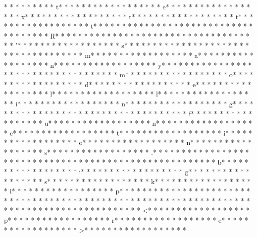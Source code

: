 *  * * *  *  * * *  * t* * *  * * *  * * *  *  * * *  *  * * *  * e* * *  * * *  * * *  *  * * *  *  * * *  * x* * *  * * *  * * *  *  * * *  *  * * *  * t* * *  * * *  * * *  *  * * *  *  * * *  * t* * *  * * *  * * *  *  * * *  *  * * *  * t* * *  * * *  * * *  *  * * *  *  * * *  * {* * *  * * *  * * *  *  * * *  *  * * *  * R* * *  * * *  * * *  *  * * *  *  * * *  * }* * *  * * *  * * *  *  * * *  *  * * *  * '* * *  * * *  * * *  *  * * *  *  * * *  * s* * *  * * *  * * *  *  * * *  *  * * *  *  * * *  * * *  * * *  *  * * *  *  * * *  * m* * *  * * *  * * *  *  * * *  *  * * *  * a* * *  * * *  * * *  *  * * *  *  * * *  * n* * *  * * *  * * *  *  * * *  *  * * *  * y* * *  * * *  * * *  *  * * *  *  * * *  *  * * *  * * *  * * *  *  * * *  *  * * *  * m* * *  * * *  * * *  *  * * *  *  * * *  * o* * *  * * *  * * *  *  * * *  *  * * *  * d* * *  * * *  * * *  *  * * *  *  * * *  * e* * *  * * *  * * *  *  * * *  *  * * *  * l* * *  * * *  * * *  *  * * *  *  * * *  * l* * *  * * *  * * *  *  * * *  *  * * *  * i* * *  * * *  * * *  *  * * *  *  * * *  * n* * *  * * *  * * *  *  * * *  *  * * *  * g* * *  * * *  * * *  *  * * *  *  * * *  *  * * *  * * *  * * *  *  * * *  *  * * *  * f* * *  * * *  * * *  *  * * *  *  * * *  * u* * *  * * *  * * *  *  * * *  *  * * *  * n* * *  * * *  * * *  *  * * *  *  * * *  * c* * *  * * *  * * *  *  * * *  *  * * *  * t* * *  * * *  * * *  *  * * *  *  * * *  * i* * *  * * *  * * *  *  * * *  *  * * *  * o* * *  * * *  * * *  *  * * *  *  * * *  * n* * *  * * *  * * *  *  * * *  *  * * *  * s* * *  * * *  * * *  *  * * *  *  * * *  * .* * *  * * *  * * *  *  * * *  *  * * *  * 
* * *  * * *  * * *  *  * * *  *  * * *  * 	* * *  * * *  * * *  *  * * *  *  * * *  * b* * *  * * *  * * *  *  * * *  *  * * *  * i* * *  * * *  * * *  *  * * *  *  * * *  * g* * *  * * *  * * *  *  * * *  *  * * *  * s* * *  * * *  * * *  *  * * *  *  * * *  * k* * *  * * *  * * *  *  * * *  *  * * *  * i* * *  * * *  * * *  *  * * *  *  * * *  * p* * *  * * *  * * *  *  * * *  *  * * *  * 
* * *  * * *  * * *  *  * * *  *  * * *  * 	* * *  * * *  * * *  *  * * *  *  * * *  * 
* * *  * * *  * * *  *  * * *  *  * * *  * 	* * *  * * *  * * *  *  * * *  *  * * *  * <* * *  * * *  * * *  *  * * *  *  * * *  * p* * *  * * *  * * *  *  * * *  *  * * *  * r* * *  * * *  * * *  *  * * *  *  * * *  * e* * *  * * *  * * *  *  * * *  *  * * *  * >* * *  * * *  * * *  *  * * *  *  * * *  * 
